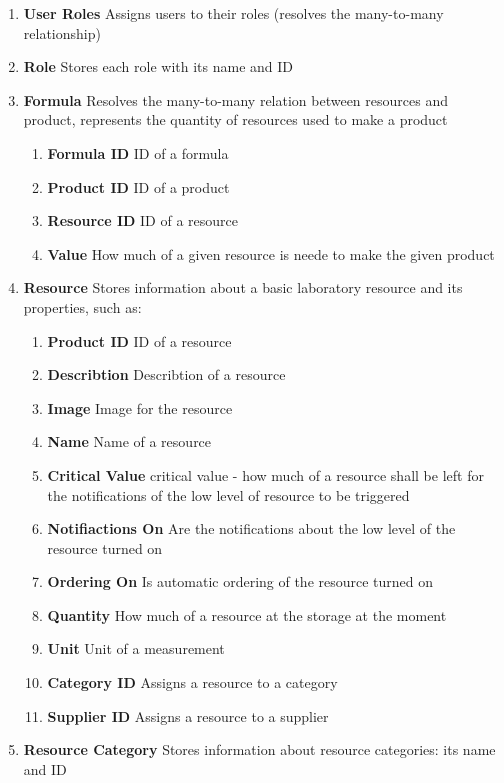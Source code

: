 \documentclass[a4paper,11pt,twoside]{report}
\theoremstyle{definition}
\begin{document}
\begin{enumerate}
\item \textbf{User Roles} Assigns users to their roles (resolves the many-to-many relationship)

\item \textbf{Role} Stores each role with its name and ID

\item \textbf{Formula}  Resolves the many-to-many relation between resources and product, represents the quantity of resources used to make a product
\begin{enumerate}
\item \textbf{Formula ID} ID of a formula
\item \textbf{Product ID} ID of a product
\item \textbf{Resource ID} ID of a resource
\item \textbf{Value} How much of a given resource is neede to make the given product
\end{enumerate}

\item \textbf{Resource}  Stores information about a basic laboratory resource and its properties, such as:
\begin{enumerate}
\item \textbf{Product ID} ID of a resource
\item \textbf{Describtion} Describtion of a resource
\item \textbf{Image} Image for the resource
\item \textbf{Name} Name of a resource
\item \textbf{Critical Value} critical value - how much of a resource shall be left for the notifications of the low level of resource to be triggered
\item \textbf{Notifiactions On} Are the notifications about the low level of the resource turned on
\item \textbf{Ordering On} Is automatic ordering of the resource turned on
\item \textbf{Quantity} How much of a resource at the storage at the moment
\item \textbf{Unit} Unit of a measurement
\item \textbf{Category ID} Assigns a resource to a category
\item \textbf{Supplier ID} Assigns a resource to a supplier
\end{enumerate}

\item \textbf{Resource Category} Stores information about resource categories: its name and ID


\end{enumerate}
\end{document}
